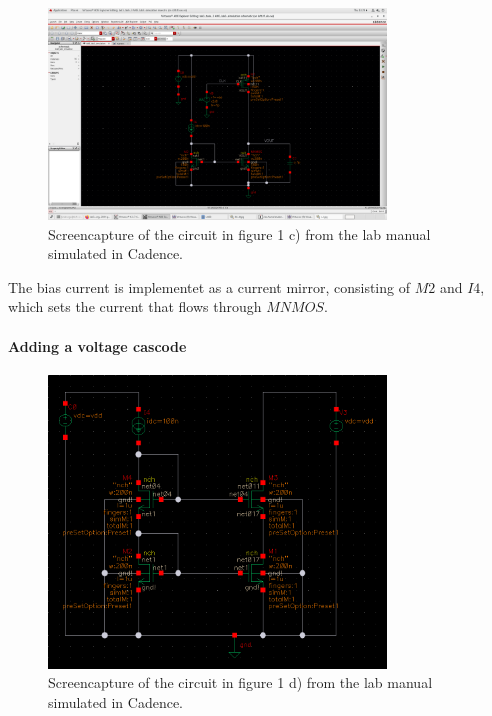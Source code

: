 \documentclass[onecolumn]{article}
\begin{document}
\begin{figure}[h!]
    \centering
    \includegraphics[width=0.8\textwidth]{c).png}
    \caption{Screencapture of the circuit in figure 1 c) from the lab manual simulated in Cadence.}
    \label{fig:circuitc}
\end{figure}

The bias current is implementet as a current mirror, consisting of $M2$ and $I4$, which sets the current that flows through $MNMOS$.

\paragraph*{Adding a voltage cascode}


\begin{figure}[h!]
    \centering
    \includegraphics[width=0.8\textwidth]{circuit_d_cascode.png}
    \caption{Screencapture of the circuit in figure 1 d) from the lab manual simulated in Cadence.}
    \label{fig:circuitd}
\end{figure}
\end{document}
